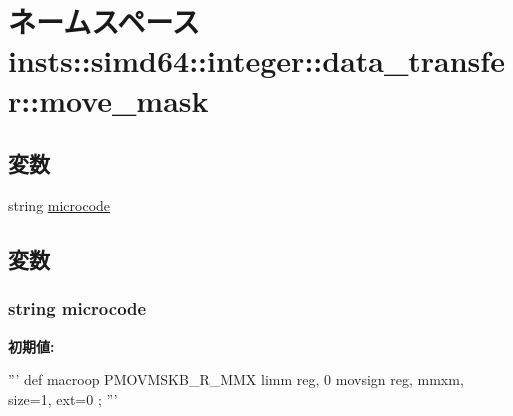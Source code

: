 \hypertarget{namespaceinsts_1_1simd64_1_1integer_1_1data__transfer_1_1move__mask}{
\section{ネームスペース insts::simd64::integer::data\_\-transfer::move\_\-mask}
\label{namespaceinsts_1_1simd64_1_1integer_1_1data__transfer_1_1move__mask}
}
\subsection*{変数}
\begin{DoxyCompactItemize}
\item 
string \hyperlink{namespaceinsts_1_1simd64_1_1integer_1_1data__transfer_1_1move__mask_a770f11a173e99389a8802f0107ed8f52}{microcode}
\end{DoxyCompactItemize}


\subsection{変数}
\hypertarget{namespaceinsts_1_1simd64_1_1integer_1_1data__transfer_1_1move__mask_a770f11a173e99389a8802f0107ed8f52}{
\subsubsection[{microcode}]{\setlength{\rightskip}{0pt plus 5cm}string {\bf microcode}}}
\label{namespaceinsts_1_1simd64_1_1integer_1_1data__transfer_1_1move__mask_a770f11a173e99389a8802f0107ed8f52}
{\bfseries 初期値:}
\begin{DoxyCode}
'''
def macroop PMOVMSKB_R_MMX {
    limm reg, 0
    movsign reg, mmxm, size=1, ext=0
};
'''
\end{DoxyCode}
